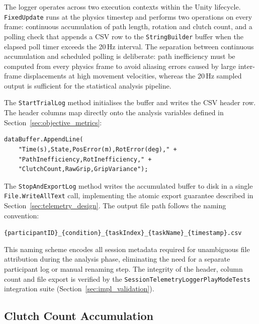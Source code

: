 The logger operates across two execution contexts within the Unity lifecycle. \texttt{FixedUpdate} runs at the physics timestep and performs two operations on every frame: continuous accumulation of path length, rotation and clutch count, and a polling check that appends a CSV row to the \texttt{StringBuilder} buffer when the elapsed poll timer exceeds the 20\,Hz interval. The separation between continuous accumulation and scheduled polling is deliberate: path inefficiency must be computed from every physics frame to avoid aliasing errors caused by large inter-frame displacements at high movement velocities, whereas the 20\,Hz sampled output is sufficient for the statistical analysis pipeline.

The \texttt{StartTrialLog} method initialises the buffer and writes the CSV header row. The header columns map directly onto the analysis variables defined in Section~\ref{sec:objective_metrics}:

\begin{lstlisting}[language={[Sharp]C}, caption={CSV header initialisation
in \texttt{SessionTelemetryLogger.StartTrialLog}.},
label={lst:csv_header}]
dataBuffer.AppendLine(
    "Time(s),State,PosError(m),RotError(deg)," +
    "PathInefficiency,RotInefficiency," +
    "ClutchCount,RawGrip,GripVariance");
\end{lstlisting}

The \texttt{StopAndExportLog} method writes the accumulated buffer to disk in a single \texttt{File.WriteAllText} call, implementing the atomic export guarantee described in Section~\ref{sec:telemetry_design}. The output file path follows the naming convention:

\begin{center}
\texttt{\{participantID\}\_\{condition\}\_\{taskIndex\}\_\{taskName\}\_\{timestamp\}.csv}
\end{center}

This naming scheme encodes all session metadata required for unambiguous file attribution during the analysis phase, eliminating the need for a separate participant log or manual renaming step. The integrity of the header, column count and file export is verified by the \texttt{SessionTelemetryLoggerPlayModeTests} integration suite (Section~\ref{sec:impl_validation}).


\subsection{Clutch Count Accumulation}
\label{sec:clutch_impl}

